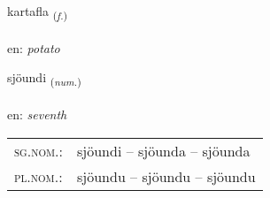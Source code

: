 \documentclass[frontgrid, backgrid]{flacards}\usepackage[]{graphicx}\usepackage[]{xcolor}
\begin{document}
\renewcommand{\flhead}{\vskip5pt \fboxsep=0pt {\small\bfseries\footnotesize Nafnorð | Noun}}
\renewcommand{\fcfoot}{\vskip5pt \fboxsep=0pt \hspace{2pt}{\small\bfseries\footnotesize 3K}}

\renewcommand{\blhead}{\vskip5pt {\small\bfseries\footnotesize Nafnorð | Noun }}
\renewcommand{\bcfoot}{\vskip5pt \hspace{2pt}{\small\bfseries\footnotesize 3K}}


{kartafla \small{\textsubscript{(\textit{f.})}} \\[1ex] %
 \\
en: \emph{potato} \\  [2ex]
\renewcommand*{\arraystretch}{0.8}
}

\renewcommand{\flhead}{\vskip5pt \fboxsep=0pt {\small\bfseries\footnotesize Töluorð | Numeral}}
\renewcommand{\fcfoot}{\vskip5pt \fboxsep=0pt \hspace{2pt}{\small\bfseries\footnotesize 3K}}

\renewcommand{\blhead}{\vskip5pt {\small\bfseries\footnotesize Töluorð | Numeral }}
\renewcommand{\bcfoot}{\vskip5pt \hspace{2pt}{\small\bfseries\footnotesize 3K}}


{sjöundi \small{\textsubscript{(\textit{num.})}} \\[1ex] %
\textphonetic{[sjœːʏntɪ]} \\
en: \emph{seventh} \\  [2ex]
\renewcommand*{\arraystretch}{0.8}
\begin{tabular}{ll}
\textsc{sg.nom.}: & sjöundi  --  sjöunda -- sjöunda \\ 
\textsc{pl.nom.}: & sjöundu -- sjöundu -- sjöundu
\end{tabular}
}
\end{document}
